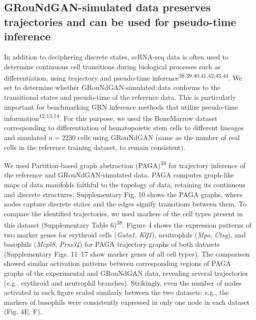 \subsection*{GRouNdGAN-simulated data preserves trajectories and can be used for pseudo-time inference}

In addition to deciphering discrete states, scRNA-seq data is often used to determine continuous cell transitions during biological processes such as differentiation, using trajectory and pseudo-time inference\textsuperscript{38,39,40,41,42,43,44}. We set to determine whether GRouNdGAN-simulated data conforms to the transitional states and pseudo-time of the reference data. This is particularly important for benchmarking GRN inference methods that utilize pseudo-time information\textsuperscript{12,13,14}. For this purpose, we used the BoneMarrow dataset corresponding to differentiation of hematopoietic stem cells to different lineages and simulated $n = 2230$ cells using GRouNdGAN (same as the number of real cells in the reference training dataset, to remain consistent).

We used Partition-based graph abstraction (PAGA)\textsuperscript{38} for trajectory inference of the reference and GRouNdGAN-simulated data. PAGA computes graph-like maps of data manifolds faithful to the topology of data, retaining its continuous and discrete structures. Supplementary Fig. 10 shows the PAGA graphs, where nodes capture discrete states and the edges signify transitions between them. To compare the identified trajectories, we used markers of the cell types present in this dataset (Supplementary Table 6)\textsuperscript{38}. Figure 4 shows the expression patterns of two marker genes for erythroid cells (\textit{Gata1}, \textit{Klf1}), neutrophils (\textit{Mpo}, \textit{Ctsg}), and basophils (\textit{Mcpt8}, \textit{Prss34}) for PAGA trajectory graphs of both datasets (Supplementary Figs. 11–17 show marker genes of all cell types). The comparison showed similar activation patterns between corresponding regions of PAGA graphs of the experimental and GRouNdGAN data, revealing several trajectories (e.g., erythroid and neutrophil branches). Strikingly, even the number of nodes activated in each figure scaled similarly between the two datasets: e.g., the markers of basophils were consistently expressed in only one node in each dataset (Fig. 4E, F).

